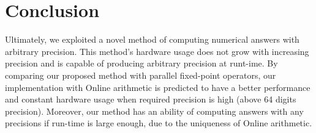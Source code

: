 \documentclass{sig-alternate}
\begin{document}
\section{Conclusion}
Ultimately, we exploited a novel method of computing numerical answers with arbitrary precision. This method's hardware usage does not grow with increasing precision and is capable of producing arbitrary precision at runt-ime. By comparing our proposed method with parallel fixed-point operators, our implementation with Online arithmetic is predicted to have a better performance and constant hardware usage when required precision is high (above 64 digits precision). Moreover, our method has an ability of computing answers with any precisions if run-time is large enough, due to the uniqueness of Online arithmetic.  


	 
	
	
\end{document}
